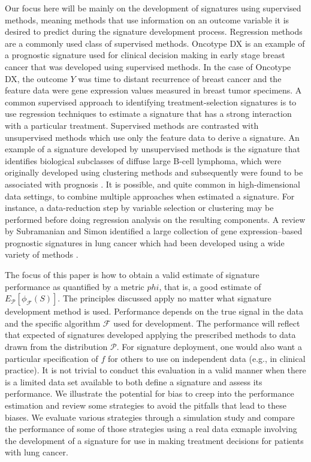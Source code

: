 \documentclass[11pt,]{article}
\begin{document}
Our focus here will be mainly on the development of signatures using
supervised methods, meaning methods that use information on an outcome
variable it is desired to predict during the signature development
process. Regression methods are a commonly used class of supervised
methods. Oncotype DX \citep{paik2004multigene} is an example of a
prognostic signature used for clinical decision making in early stage
breast cancer that was developed using supervised methods. In the case
of Oncotype DX, the outcome \(Y\) was time to distant recurrence of
breast cancer and the feature data were gene expression values measured
in breast tumor specimens. A common supervised approach to identifying
treatment-selection signatures is to use regression techniques to
estimate a signature that has a strong interaction with a particular
treatment. Supervised methods are contrasted with unsupervised methods
which use only the feature data to derive a signature. An example of a
signature developed by unsupervised methods is the signature that
identifies biological subclasses of diffuse large B-cell lymphoma, which
were originally developed using clustering methods and subsequently were
found to be associated with prognosis \citep{alizadeh2000distinct}. It
is possible, and quite common in high-dimensional data settings, to
combine multiple approaches when estimated a signature. For instance, a
data-reduction step by variable selection or clustering may be performed
before doing regression analysis on the resulting components. A review
by Subramanian and Simon identified a large collection of gene
expression--based prognostic signatures in lung cancer which had been
developed using a wide variety of methods \citep{subramanian2010gene}.

The focus of this paper is how to obtain a valid estimate of signature
performance as quantified by a metric \(phi\), that is, a good estimate
of \(E_\mathcal{P}[\phi_\mathcal{F}(S)]\). The principles discussed
apply no matter what signature development method is used. Performance
depends on the true signal in the data and the specific algorithm
\(\mathcal{F}\) used for development. The performance will reflect that
expected of signatures developed applying the prescribed methods to data
drawn from the distribution \(\mathcal{P}\). For signature deployment,
one would also want a particular specification of \(f\) for others to
use on independent data (e.g., in clinical practice). It is not trivial
to conduct this evaluation in a valid manner when there is a limited
data set available to both define a signature and assess its
performance. We illustrate the potential for bias to creep into the
performance estimation and review some strategies to avoid the pitfalls
that lead to these biases. We evaluate various strategies through a
simulation study and compare the performance of some of those strategies
using a real data exmaple involving the development of a signature for
use in making treatment decisions for patients with lung cancer.
\end{document}
